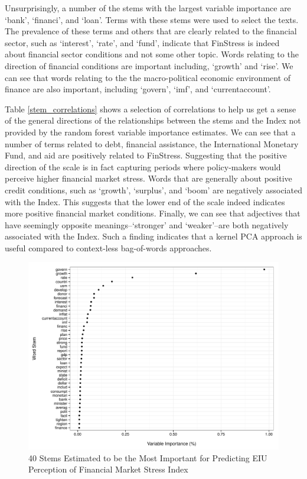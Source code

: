 \documentclass[]{article}
\begin{document}
Unsurprisingly, a number of the stems with the largest variable importance are `bank', `financi', and `loan'. Terms with these stems were used to select the texts. The prevalence of these terms and others that are clearly related to the financial sector, such as `interest', `rate', and `fund', indicate that FinStress is indeed about financial sector conditions and not some other topic. Words relating to the direction of financial conditions are important including, `growth' and `rise'. We can see that words relating to the the macro-political economic environment of finance are also important, including `govern', `imf', and `currentaccount'.

Table \ref{stem_correlations} shows a selection of correlations to help us get a sense of the general directions of the relationships between the stems and the Index not provided by the random forest variable importance estimates. We can see that a number of terms related to debt, financial assistance, the International Monetary Fund, and aid are positively related to FinStress. Suggesting that the positive direction of the scale is in fact capturing periods where policy-makers would perceive higher financial market stress. Words that are generally about positive credit conditions, such as `growth', `surplus', and `boom' are negatively associated with the Index. This suggests that the lower end of the scale indeed indicates more positive financial market conditions. Finally, we can see that adjectives that have seemingly opposite meanings--`stronger' and `weaker'--are both negatively associated with the Index. Such a finding indicates that a kernel PCA approach is useful compared to context-less bag-of-words approaches.

\begin{figure}
    \caption{40 Stems Estimated to be the Most Important for Predicting EIU Perception of Financial Market Stress Index}
    \label{rf_importance}

    \begin{center}
        \includegraphics[scale=0.5]{figures/rf_stem_importance.pdf}
    \end{center}

\end{figure}
\end{document}
